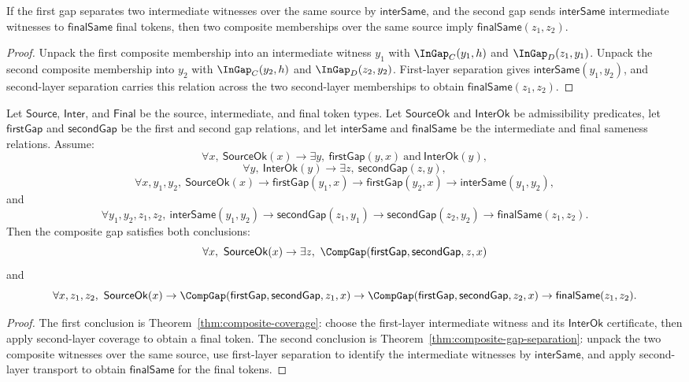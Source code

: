 \begin{theorem}
\label{thm:composite-gap-separation}
If the first gap separates two intermediate witnesses over the same source by $\mathsf{interSame}$, and the second gap sends $\mathsf{interSame}$ intermediate witnesses to $\mathsf{finalSame}$ final tokens, then two composite memberships over the same source imply $\mathsf{finalSame}(z_1,z_2)$.
\end{theorem}
\begin{proof}
Unpack the first composite membership into an intermediate witness $y_1$ with $\InGap_C(y_1,h)$ and $\InGap_D(z_1,y_1)$. Unpack the second composite membership into $y_2$ with $\InGap_C(y_2,h)$ and $\InGap_D(z_2,y_2)$. First-layer separation gives $\mathsf{interSame}(y_1,y_2)$, and second-layer separation carries this relation across the two second-layer memberships to obtain $\mathsf{finalSame}(z_1,z_2)$.
\end{proof}

\begin{theorem}
\label{thm:composite-exactness-from-layers}
Let $\mathsf{Source}$, $\mathsf{Inter}$, and $\mathsf{Final}$ be the source, intermediate, and final token types. Let $\mathsf{SourceOk}$ and $\mathsf{InterOk}$ be admissibility predicates, let $\mathsf{firstGap}$ and $\mathsf{secondGap}$ be the first and second gap relations, and let $\mathsf{interSame}$ and $\mathsf{finalSame}$ be the intermediate and final sameness relations. Assume:
$$
\forall x,\ \mathsf{SourceOk}(x) \to
\exists y,\ \mathsf{firstGap}(y,x)\ \text{and}\ \mathsf{InterOk}(y),
$$
$$
\forall y,\ \mathsf{InterOk}(y) \to
\exists z,\ \mathsf{secondGap}(z,y),
$$
$$
\forall x,y_1,y_2,\ \mathsf{SourceOk}(x) \to
\mathsf{firstGap}(y_1,x) \to
\mathsf{firstGap}(y_2,x) \to
\mathsf{interSame}(y_1,y_2),
$$
and
$$
\forall y_1,y_2,z_1,z_2,\ \mathsf{interSame}(y_1,y_2) \to
\mathsf{secondGap}(z_1,y_1) \to
\mathsf{secondGap}(z_2,y_2) \to
\mathsf{finalSame}(z_1,z_2).
$$
Then the composite gap satisfies both conclusions:
$$
\forall x,\ \mathsf{SourceOk}(x) \to
\exists z,\ \CompGap(\mathsf{firstGap},\mathsf{secondGap},z,x)
$$
and
$$
\forall x,z_1,z_2,\ \mathsf{SourceOk}(x) \to
\CompGap(\mathsf{firstGap},\mathsf{secondGap},z_1,x) \to
\CompGap(\mathsf{firstGap},\mathsf{secondGap},z_2,x) \to
\mathsf{finalSame}(z_1,z_2).
$$
\end{theorem}
\begin{proof}
The first conclusion is Theorem~\ref{thm:composite-coverage}: choose the first-layer intermediate witness and its $\mathsf{InterOk}$ certificate, then apply second-layer coverage to obtain a final token. The second conclusion is Theorem~\ref{thm:composite-gap-separation}: unpack the two composite witnesses over the same source, use first-layer separation to identify the intermediate witnesses by $\mathsf{interSame}$, and apply second-layer transport to obtain $\mathsf{finalSame}$ for the final tokens.
\end{proof}

